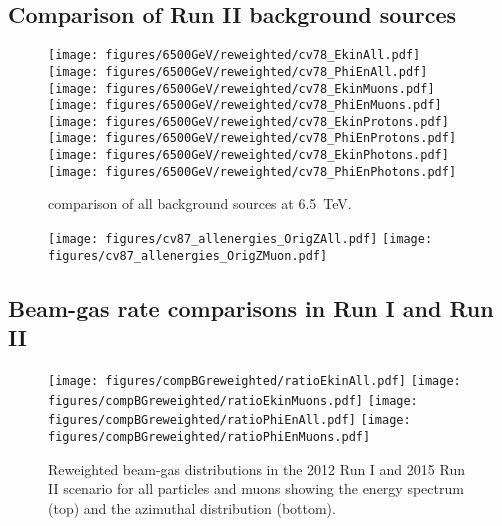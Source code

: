 \subsection{Comparison of Run II background sources}
\begin{figure}
\begin{center}
  \texttt{[image: figures/6500GeV/reweighted/cv78\_EkinAll.pdf]}
  \texttt{[image: figures/6500GeV/reweighted/cv78\_PhiEnAll.pdf]}
  \texttt{[image: figures/6500GeV/reweighted/cv78\_EkinMuons.pdf]}
  \texttt{[image: figures/6500GeV/reweighted/cv78\_PhiEnMuons.pdf]}
  \texttt{[image: figures/6500GeV/reweighted/cv78\_EkinProtons.pdf]}
  \texttt{[image: figures/6500GeV/reweighted/cv78\_PhiEnProtons.pdf]}
 \texttt{[image: figures/6500GeV/reweighted/cv78\_EkinPhotons.pdf]}
 \texttt{[image: figures/6500GeV/reweighted/cv78\_PhiEnPhotons.pdf]}
\end{center}
\vspace{-0.6cm}
 \caption{comparison of all background sources at 6.5~TeV.
  \label{compAllBKG_6.5}}
\end{figure}

\begin{figure}
\begin{center}
  \texttt{[image: figures/cv87\_allenergies\_OrigZAll.pdf]}
  \texttt{[image: figures/cv87\_allenergies\_OrigZMuon.pdf]}
\end{center}
\vspace{-0.6cm}
 \caption{
  \label{fig:OrigZMuonAllEn}} 
\end{figure}

\subsection{Beam-gas rate comparisons in Run I and Run II}
\begin{figure}[!htb]
\centering
\texttt{[image: figures/compBGreweighted/ratioEkinAll.pdf]}
\texttt{[image: figures/compBGreweighted/ratioEkinMuons.pdf]}
\texttt{[image: figures/compBGreweighted/ratioPhiEnAll.pdf]}
\texttt{[image: figures/compBGreweighted/ratioPhiEnMuons.pdf]}
\caption{Reweighted beam-gas distributions in the 2012 Run I and 2015 Run II scenario for all particles and muons showing the energy spectrum (top) and the azimuthal distribution (bottom).
  \label{fig:compBGreweighted1}}
\end{figure}

